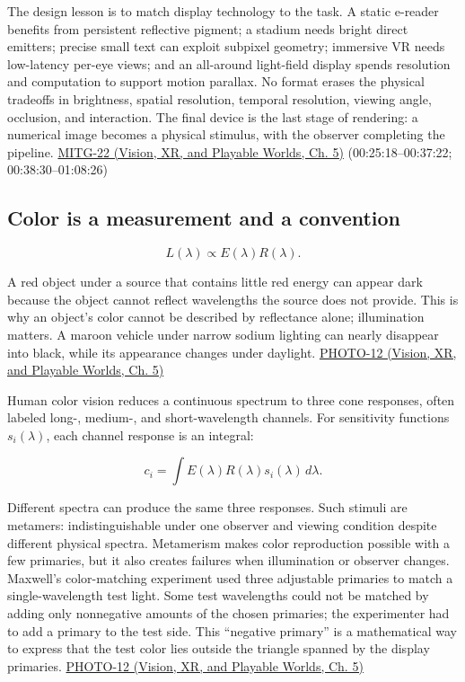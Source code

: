 The design lesson is to match display technology to the task. A static e-reader benefits from persistent reflective pigment; a stadium needs bright direct emitters; precise small text can exploit subpixel geometry; immersive VR needs low-latency per-eye views; and an all-around light-field display spends resolution and computation to support motion parallax. No format erases the physical tradeoffs in brightness, spatial resolution, temporal resolution, viewing angle, occlusion, and interaction. The final device is the last stage of rendering: a numerical image becomes a physical stimulus, with the observer completing the pipeline. \href{../07-Vision-XR-and-Playable-Worlds/main.pdf\#nameddest=04-visual-computing-ii-ch036-mitg-22---output-devices}{MITG-22 (Vision, XR, and Playable Worlds, Ch. 5)} (00:25:18--00:37:22; 00:38:30--01:08:26)

\subsection{Color is a measurement and a convention}\label{03-visual-computing-i-ch004-color-is-a-measurement-and-a-convention}

\hypertarget{03-visual-computing-i-ch004-color-is-a-measurement-and-a-convention}{}

\[
L(\lambda)\propto E(\lambda)R(\lambda).
\]

A red object under a source that contains little red energy can appear dark because the object cannot reflect wavelengths the source does not provide. This is why an object's color cannot be described by reflectance alone; illumination matters. A maroon vehicle under narrow sodium lighting can nearly disappear into black, while its appearance changes under daylight. \href{../07-Vision-XR-and-Playable-Worlds/main.pdf\#nameddest=04-visual-computing-ii-ch036-photo-12---photography-session-12}{PHOTO-12 (Vision, XR, and Playable Worlds, Ch. 5)}

Human color vision reduces a continuous spectrum to three cone responses, often labeled long-, medium-, and short-wavelength channels. For sensitivity functions \(s_i(\lambda)\), each channel response is an integral:

\[
c_i=\int E(\lambda)R(\lambda)s_i(\lambda)\,d\lambda.
\]

Different spectra can produce the same three responses. Such stimuli are metamers: indistinguishable under one observer and viewing condition despite different physical spectra. Metamerism makes color reproduction possible with a few primaries, but it also creates failures when illumination or observer changes. Maxwell's color-matching experiment used three adjustable primaries to match a single-wavelength test light. Some test wavelengths could not be matched by adding only nonnegative amounts of the chosen primaries; the experimenter had to add a primary to the test side. This ``negative primary'' is a mathematical way to express that the test color lies outside the triangle spanned by the display primaries. \href{../07-Vision-XR-and-Playable-Worlds/main.pdf\#nameddest=04-visual-computing-ii-ch036-photo-12---photography-session-12}{PHOTO-12 (Vision, XR, and Playable Worlds, Ch. 5)}

